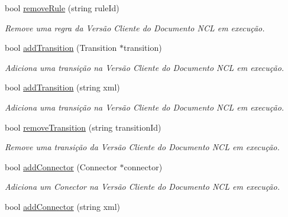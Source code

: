 \begin{DoxyCompactItemize}
bool \hyperlink{classbr_1_1ufscar_1_1lince_1_1ginga_1_1wac_1_1editing_1_1ClientEditingManager_a5b363245776a5a71bd3c7628dcf91f7e}{removeRule} (string ruleId)
\begin{DoxyCompactList}\small\item\em Remove uma regra da Versão Cliente do Documento NCL em execução. \item\end{DoxyCompactList}\item 
bool \hyperlink{classbr_1_1ufscar_1_1lince_1_1ginga_1_1wac_1_1editing_1_1ClientEditingManager_af872bea61e20e96b7ef968e24627d8c7}{addTransition} (Transition $\ast$transition)
\begin{DoxyCompactList}\small\item\em Adiciona uma transição na Versão Cliente do Documento NCL em execução. \item\end{DoxyCompactList}\item 
bool \hyperlink{classbr_1_1ufscar_1_1lince_1_1ginga_1_1wac_1_1editing_1_1ClientEditingManager_a474cdd2a429ab96cb5376264ff38fa31}{addTransition} (string xml)
\begin{DoxyCompactList}\small\item\em Adiciona uma transição na Versão Cliente do Documento NCL em execução. \item\end{DoxyCompactList}\item 
bool \hyperlink{classbr_1_1ufscar_1_1lince_1_1ginga_1_1wac_1_1editing_1_1ClientEditingManager_a6aebcca439720cc2c9b69d6b7b5c45c7}{removeTransition} (string transitionId)
\begin{DoxyCompactList}\small\item\em Remove uma transição da Versão Cliente do Documento NCL em execução. \item\end{DoxyCompactList}\item 
bool \hyperlink{classbr_1_1ufscar_1_1lince_1_1ginga_1_1wac_1_1editing_1_1ClientEditingManager_afbc2f133a39eff4008bba3817f8c76a1}{addConnector} (Connector $\ast$connector)
\begin{DoxyCompactList}\small\item\em Adiciona um Conector na Versão Cliente do Documento NCL em execução. \item\end{DoxyCompactList}\item 
bool \hyperlink{classbr_1_1ufscar_1_1lince_1_1ginga_1_1wac_1_1editing_1_1ClientEditingManager_a62f5c2e221cba63f7a47c3a8ce1d154f}{addConnector} (string xml)

\end{DoxyCompactItemize}
